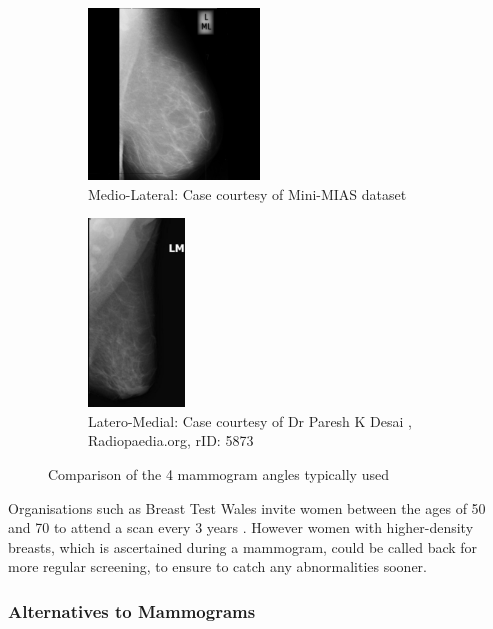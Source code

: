 \begin{figure}[!ht]
    \begin{subfigure}[ht!]{0.4\textwidth}
          \includegraphics[width=0.5\textwidth]{Chapter1/background-img/ML.jpg}
          \caption{Medio-Lateral: Case courtesy of Mini-MIAS dataset \cite{Suckling_1994}}
          \label{fig:LM}
    \end{subfigure}
    \hspace{\fill}
    \begin{subfigure}[ht!]{0.4\textwidth}
          \includegraphics[height=5cm]{Chapter1/background-img/LM.jpg}
          \caption{Latero-Medial: Case courtesy of Dr Paresh K Desai , Radiopaedia.org, rID: 5873}
          \label{fig:ML}
    \end{subfigure}
  \caption{Comparison of the 4 mammogram angles typically used}
  \label{fig:scan-angles}
\end{figure}

Organisations such as Breast Test Wales invite women between the ages of 50 and 70 to attend a scan every 3 years \cite{Informed_Choice_about_Cancer_Screening_2013}. However women with higher-density breasts, which is ascertained during a mammogram, could be called back for more regular screening, to ensure to catch any abnormalities sooner.

\subsubsection{Alternatives to Mammograms}

